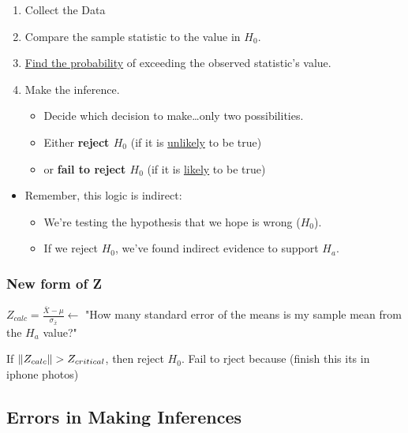 \documentclass[11pt]{report}
\begin{document}
\begin{enumerate}
\begin{itemize}
\begin{itemize}
        \end{itemize}
    \end{itemize}
    \item Collect the Data
    \item Compare the sample statistic to the value in $H_0$.
    \item \underline{Find the probability} of exceeding the observed statistic's value.
    \item Make the inference. 
    \begin{itemize}
        \item Decide which decision to make\dots only two possibilities. 
        \item Either \textbf{reject $H_0$} (if it is \underline{unlikely} to be true)
        \item or \textbf{fail to reject $H_0$} (if it is \underline{likely} to be true)
    \end{itemize}
\end{enumerate}
\begin{itemize}
    \item Remember, this logic is indirect:
    \begin{itemize}
        \item We're testing the hypothesis that we hope is wrong ($H_0$).
        \item If we reject $H_0$, we've found indirect evidence to support $H_a$.
    \end{itemize}
\end{itemize}

\subsubsection{New form of Z}

$Z_{calc} = \frac{\bar{X} - \mu}{\sigma_{\bar{x}}} \leftarrow$ "How many standard error of the means is my sample mean from the $H_a$ value?" \newline\newline 

If $\rVert Z_{calc}\rVert > Z_{critical}$, then reject $H_0$. \newline
Fail to rject because (finish this its in iphone photos)


\subsection{Errors in Making Inferences} 
\end{document}
